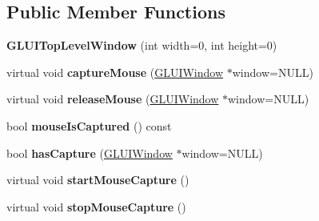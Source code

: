 \subsection*{Public Member Functions}
\begin{DoxyCompactItemize}
\item 
\hypertarget{classCartWheel_1_1GL_1_1GLUITopLevelWindow_a6ba59afaf5b37d80332ec7e959b663b0}{
{\bfseries GLUITopLevelWindow} (int width=0, int height=0)}
\label{classCartWheel_1_1GL_1_1GLUITopLevelWindow_a6ba59afaf5b37d80332ec7e959b663b0}

\item 
\hypertarget{classCartWheel_1_1GL_1_1GLUITopLevelWindow_a8035b0ebdcb138ff9b06160f13f39517}{
virtual void {\bfseries captureMouse} (\hyperlink{classCartWheel_1_1GL_1_1GLUIWindow}{GLUIWindow} $\ast$window=NULL)}
\label{classCartWheel_1_1GL_1_1GLUITopLevelWindow_a8035b0ebdcb138ff9b06160f13f39517}

\item 
\hypertarget{classCartWheel_1_1GL_1_1GLUITopLevelWindow_a138f762dd3914c175ae5b3e1b95a1cd5}{
virtual void {\bfseries releaseMouse} (\hyperlink{classCartWheel_1_1GL_1_1GLUIWindow}{GLUIWindow} $\ast$window=NULL)}
\label{classCartWheel_1_1GL_1_1GLUITopLevelWindow_a138f762dd3914c175ae5b3e1b95a1cd5}

\item 
\hypertarget{classCartWheel_1_1GL_1_1GLUITopLevelWindow_a07dab4c240a2419e27bc41a77502fe8e}{
bool {\bfseries mouseIsCaptured} () const }
\label{classCartWheel_1_1GL_1_1GLUITopLevelWindow_a07dab4c240a2419e27bc41a77502fe8e}

\item 
\hypertarget{classCartWheel_1_1GL_1_1GLUITopLevelWindow_a6d84d444fabef9f0e5b8374a98506038}{
bool {\bfseries hasCapture} (\hyperlink{classCartWheel_1_1GL_1_1GLUIWindow}{GLUIWindow} $\ast$window=NULL)}
\label{classCartWheel_1_1GL_1_1GLUITopLevelWindow_a6d84d444fabef9f0e5b8374a98506038}

\item 
\hypertarget{classCartWheel_1_1GL_1_1GLUITopLevelWindow_a2bec00aeda3483d3409e17185194c578}{
virtual void {\bfseries startMouseCapture} ()}
\label{classCartWheel_1_1GL_1_1GLUITopLevelWindow_a2bec00aeda3483d3409e17185194c578}

\item 
\hypertarget{classCartWheel_1_1GL_1_1GLUITopLevelWindow_a4021d2e674bef7cce7c3ce622ac503ff}{
virtual void {\bfseries stopMouseCapture} ()}
\label{classCartWheel_1_1GL_1_1GLUITopLevelWindow_a4021d2e674bef7cce7c3ce622ac503ff}

\end{DoxyCompactItemize}
